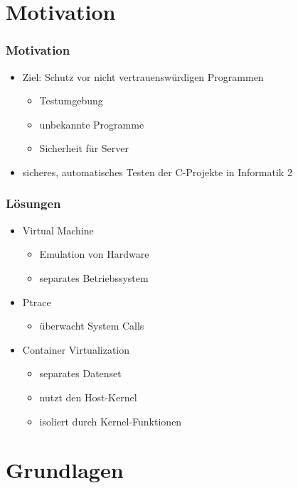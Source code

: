 \section{Motivation}

\begin{frame}
  \frametitle{Motivation}
  \begin{itemize}
  \item Ziel: Schutz vor nicht vertrauenswürdigen Programmen
  \begin{itemize}
   \item Testumgebung
   \item unbekannte Programme
   \item Sicherheit für Server
  \end{itemize}
  \item sicheres, automatisches Testen der C-Projekte in Informatik 2
  \end{itemize}
\end{frame}


\begin{frame}
  \frametitle{Lösungen}
  \begin{itemize}
    \item{Virtual Machine}
    \begin{itemize}
      \item{Emulation von Hardware}
      \item{separates Betriebssystem}
    \end{itemize}
    \item{Ptrace}
    \begin{itemize}
      \item{überwacht System Calls}
    \end{itemize}
    \item{Container Virtualization}
    \begin{itemize}
      \item separates Datenset
      \item nutzt den Host-Kernel
      \item isoliert durch Kernel-Funktionen
    \end{itemize}
  \end{itemize}
\end{frame}


\section{Grundlagen}

